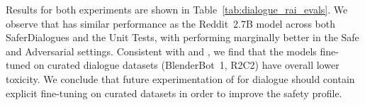 \begin{table}[t]
    \centering
{}
    \caption{{\bf Dialogue Responsible AI evaluations.} \OPT{} is roughly on par with the Reddit 2.7B model, but performs
    worse in the \textit{Unsafe} setting.}
    \label{tab:dialogue_rai_evals}
\end{table}

Results for both experiments are shown in Table~\ref{tab:dialogue_rai_evals}. We observe that \OPT{} has similar performance as the Reddit~2.7B model across both SaferDialogues and the Unit Tests, with \OPT{} performing marginally better in the Safe and Adversarial settings. Consistent with \citet{roller-etal-2021-recipes} and \citet{xu2020recipes}, we find that the models fine-tuned on curated dialogue datasets (BlenderBot~1, R2C2) have overall lower toxicity. We conclude that future experimentation of \OPT{} for dialogue should contain explicit fine-tuning on curated datasets in order to improve the safety profile.